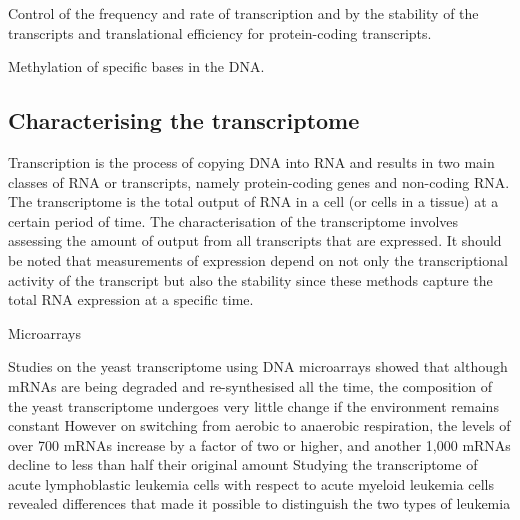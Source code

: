 Control of the frequency and rate of transcription and by the stability of the transcripts and translational efficiency for protein-coding transcripts.

Methylation of specific bases in the DNA.

\subsection{Characterising the transcriptome}

Transcription is the process of copying DNA into RNA and results in two main classes of RNA or transcripts, namely protein-coding genes and non-coding RNA. The transcriptome is the total output of RNA in a cell (or cells in a tissue) at a certain period of time. The characterisation of the transcriptome involves assessing the amount of output from all transcripts that are expressed. It should be noted that measurements of expression depend on not only the transcriptional activity of the transcript but also the stability since these methods capture the total RNA expression at a specific time.

Microarrays\cite{pmid7569999}

Studies on the yeast transcriptome using DNA microarrays showed that although mRNAs are being degraded and re-synthesised all the time, the composition of the yeast transcriptome undergoes very little change if the environment remains constant\cite{pmid9381177}
However on switching from aerobic to anaerobic respiration, the levels of over 700 mRNAs increase by a factor of two or higher, and another 1,000 mRNAs decline to less than half their original amount
Studying the transcriptome of acute lymphoblastic leukemia cells with respect to acute myeloid leukemia cells revealed differences that made it possible to distinguish the two types of leukemia

